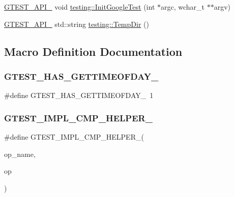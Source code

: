 \begin{DoxyCompactItemize}
\item 
\mbox{\hyperlink{_obj__test_2lib_2googletest-release-1_88_81_2googletest_2include_2gtest_2internal_2gtest-port_8h_aa73be6f0ba4a7456180a94904ce17790}{G\+T\+E\+S\+T\+\_\+\+A\+P\+I\+\_\+}} void \mbox{\hyperlink{namespacetesting_ae5a88709a4a7529e30c83242156556b3}{testing\+::\+Init\+Google\+Test}} (int $\ast$argc, wchar\+\_\+t $\ast$$\ast$argv)
\item 
\mbox{\hyperlink{_obj__test_2lib_2googletest-release-1_88_81_2googletest_2include_2gtest_2internal_2gtest-port_8h_aa73be6f0ba4a7456180a94904ce17790}{G\+T\+E\+S\+T\+\_\+\+A\+P\+I\+\_\+}} std\+::string \mbox{\hyperlink{namespacetesting_aae1bbe7c3cc99bf56263d51d3982a52e}{testing\+::\+Temp\+Dir}} ()
\end{DoxyCompactItemize}


\subsection{Macro Definition Documentation}
\mbox{\label{_obj__test_2lib_2googletest-release-1_88_81_2googletest_2src_2gtest_8cc_a7c139c1711de5a69cbc934e8a082e4f9}} 
\subsubsection{\texorpdfstring{GTEST\_HAS\_GETTIMEOFDAY\_}{GTEST\_HAS\_GETTIMEOFDAY\_}}
{\footnotesize\ttfamily \#define G\+T\+E\+S\+T\+\_\+\+H\+A\+S\+\_\+\+G\+E\+T\+T\+I\+M\+E\+O\+F\+D\+A\+Y\+\_\+~1}

\mbox{\label{_obj__test_2lib_2googletest-release-1_88_81_2googletest_2src_2gtest_8cc_a4a5b6fbde5dd05e05dd6846ac5e5c18e}} 
\subsubsection{\texorpdfstring{GTEST\_IMPL\_CMP\_HELPER\_}{GTEST\_IMPL\_CMP\_HELPER\_}}
{\footnotesize\ttfamily \#define G\+T\+E\+S\+T\+\_\+\+I\+M\+P\+L\+\_\+\+C\+M\+P\+\_\+\+H\+E\+L\+P\+E\+R\+\_\+(\begin{DoxyParamCaption}\item[{}]{op\+\_\+name,  }\item[{}]{op }\end{DoxyParamCaption})}

